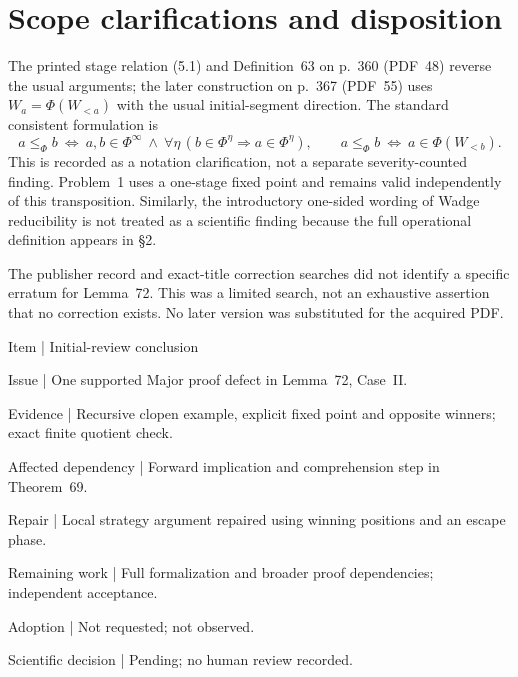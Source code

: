 \documentclass[10pt]{article}
\begin{document}
\section*{Scope clarifications and disposition}
The printed stage relation (5.1) and Definition 63 on p. 360 (PDF 48) reverse the usual arguments; the later construction on p. 367 (PDF 55) uses \(W_a=\Phi(W_{<a})\) with the usual initial-segment direction. The standard consistent formulation is \[a\leq_\Phi b\ \Longleftrightarrow\
 a,b\in\Phi^\infty\ \wedge\
 \forall\eta\,(b\in\Phi^\eta\Rightarrow a\in\Phi^\eta),
 \qquad a\leq_\Phi b\ \Longleftrightarrow\ a\in\Phi(W_{<b}).\] This is recorded as a notation clarification, not a separate severity-counted finding. Problem 1 uses a one-stage fixed point and remains valid independently of this transposition. Similarly, the introductory one-sided wording of Wadge reducibility is not treated as a scientific finding because the full operational definition appears in §2.\par
The publisher record and exact-title correction searches did not identify a specific erratum for Lemma 72. This was a limited search, not an exhaustive assertion that no correction exists. No later version was substituted for the acquired PDF.\par
Item | Initial-review conclusion\par
Issue | One supported Major proof defect in Lemma 72, Case II.\par
Evidence | Recursive clopen example, explicit fixed point and opposite winners; exact finite quotient check.\par
Affected dependency | Forward implication and comprehension step in Theorem 69.\par
Repair | Local strategy argument repaired using winning positions and an escape phase.\par
Remaining work | Full formalization and broader proof dependencies; independent acceptance.\par
Adoption | Not requested; not observed.\par
Scientific decision | Pending; no human review recorded.\par
\end{document}
